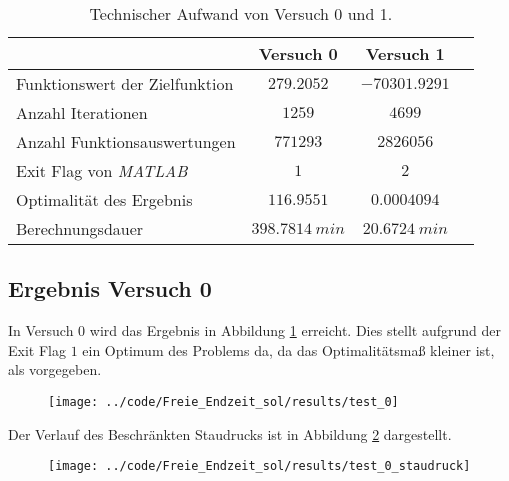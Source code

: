 \begin{table}[H]
    \centering
    \caption{Technischer Aufwand von Versuch 0 und 1.}\label{tab:Versuch_TA}
    \begin{tabularx}{.9\textwidth}{Zccc}
        \toprule
         & \textbf{Versuch 0} & \textbf{Versuch 1} \\
        \midrule
        Funktionswert der Zielfunktion & $279.2052$ & $-70301.9291$ \\
        Anzahl Iterationen & $1259$ & $4699$ \\
        Anzahl Funktionsauswertungen & $771293$ & $2826056$ \\
        Exit Flag von \textit{MATLAB} & $1$ & $2$ \\
        Optimalität des Ergebnis & $116.9551$ & $0.0004094$ \\
        Berechnungsdauer & $398.7814 \ min$ & $20.6724 \ min$ \\
        \bottomrule
    \end{tabularx}
\end{table}




\subsection{Ergebnis Versuch 0}\label{kap:Versuch0_OptTf}
In Versuch 0 wird das Ergebnis in Abbildung \ref{img:test_0_OptTf} erreicht. Dies stellt aufgrund der Exit Flag $1$ ein Optimum des Problems da, da das Optimalitätsmaß kleiner ist, als vorgegeben.
\begin{figure}[H]
\begin{center}
\texttt{[image: ../code/Freie\_Endzeit\_sol/results/test\_0]}
 \label{img:test_0_OptTf}
\end{center}
\end{figure}
Der Verlauf des Beschränkten Staudrucks ist in Abbildung \ref{img:test_0_staudruck_OptTf} dargestellt.
\begin{figure}[H]
\begin{center}
\texttt{[image: ../code/Freie\_Endzeit\_sol/results/test\_0\_staudruck]}
 \label{img:test_0_staudruck_OptTf}
\end{center}
\end{figure}





